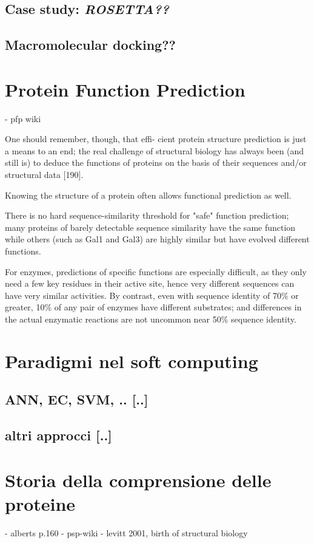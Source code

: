 \subsection{Case study: \textit{ROSETTA??}}

\subsection{Macromolecular docking??}

\section{Protein Function Prediction}
- pfp wiki

One should remember, though, that effi-
cient protein structure prediction is just a means to an end; the real challenge of structural
biology has always been (and still is) to deduce the functions of proteins on the basis of their
sequences and/or structural data [190].

Knowing the structure of a protein often allows functional prediction as well.

There is no hard sequence-similarity threshold for "safe" function prediction; many proteins of barely
detectable sequence similarity have the same function while others (such as Gal1 and Gal3) are highly
similar but have evolved different functions. 

For enzymes, predictions of specific functions are especially difficult, as they only need a few key residues
in their active site, hence very different sequences can have very similar activities. By contrast, even with
sequence identity of 70\% or greater, 10\% of any pair of enzymes have different substrates; and differences
in the actual enzymatic reactions are not uncommon near 50\% sequence identity.

\section{Paradigmi nel soft computing}
\subsection{ANN, EC, SVM, .. [..]}
\subsection{altri approcci [..]}


\section{Storia della comprensione delle proteine}
- alberts p.160
- psp-wiki
- levitt 2001, birth of structural biology \\ \\


